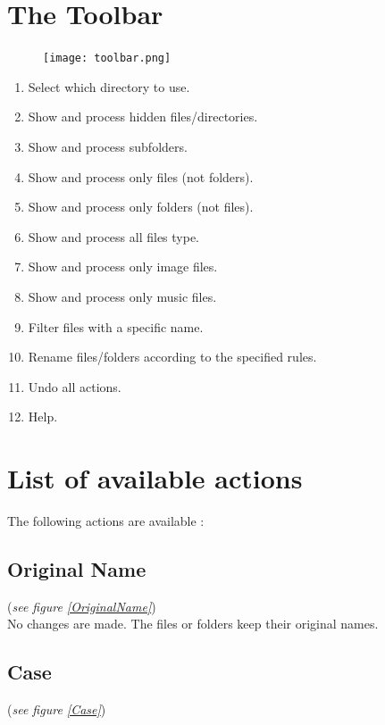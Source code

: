 \documentclass[11pt, a4paper]{scrartcl}
\begin{document}
\section{The Toolbar}
\begin{figure}[!ht]
        \centering
        \texttt{[image: toolbar.png]}
        \label{toolbar}
\end{figure}
\begin{enumerate}
        \item Select which directory to use.
        \item Show and process hidden files/directories.
        \item Show and process subfolders.
        \item Show and process only files (not folders).
        \item Show and process only folders (not files).
        \item Show and process all files type.
        \item Show and process only image files.
        \item Show and process only music files.
        \item Filter files with a specific name.
        \item Rename files/folders according to the specified rules.
        \item Undo all actions.
        \item Help.
\end{enumerate}

\section{List of available actions}
The following actions are available :

\subsection*{Original Name}
(\emph{see figure \ref{OriginalName}})\\

No changes are made. The files or folders keep their original names.

\subsection*{Case}
(\emph{see figure \ref{Case}})\\
\end{document}
